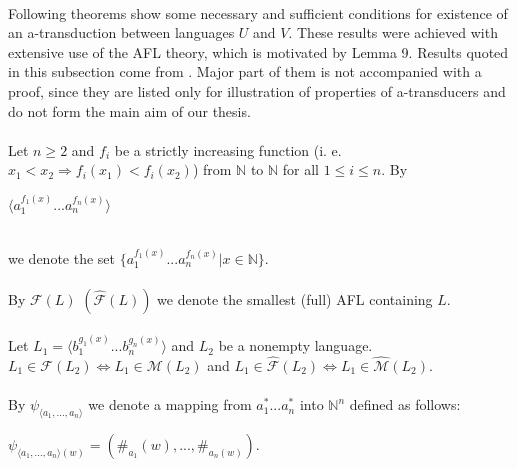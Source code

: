 \paragraph{}
Following theorems show some necessary and sufficient conditions for existence of an a-transduction between languages $U$ and $V$. These results were achieved with extensive use of the AFL theory, which is motivated by Lemma 9. Results quoted in this subsection come from \cite{Rovan:AFL}. Major part of them is not accompanied with a proof, since they are listed only for illustration of properties of a-transducers and do not form the main aim of our thesis.

\paragraph{}
\oznacenie Let $n \geq 2$ and $f_{i}$ be a strictly increasing function (i. e. $x_{1} < x_{2} \Rightarrow f_{i}(x_{1}) < f_{i}(x_{2})$) from $\mathbb{N} $ to $\mathbb{N} $ for all $ 1 \leq i \leq n$. By \\
\centerline{$\langle a_{1}^{f_{1}(x)}...a_{n}^{f_{n}(x)} \rangle $} \\
we denote the set $\{ a_{1}^{f_{1}(x)}...a_{n}^{f_{n}(x)} | x \in \mathbb{N} \} $.

\paragraph{}
\oznacenie By $\mathcal{F}(L) $ $(\hat{\mathcal{F}} (L) )$ we denote the smallest (full) AFL containing $L$.

\paragraph{}
\clema Let $L_{1} = \langle b_{1}^{g_{1}(x)}...b_{n}^{g_{n}(x)} \rangle $ and $L_{2}$ be a nonempty language. $L_{1} \in \mathcal{F}(L_{2}) \Leftrightarrow L_{1} \in \mathcal{M}(L_{2})$ and $L_{1} \in \hat{\mathcal{F}}(L_{2}) \Leftrightarrow L_{1} \in \hat{\mathcal{M}}(L_{2})$.

\paragraph{}
\oznacenie By $\psi_{\langle a_{1},...,a_{n}\rangle }$ we denote a mapping from $a_{1}^{*}...a_{n}^{*}$ into $\mathbb{N}^{n}$ defined as follows: \\
\centerline{$\psi_{\langle a_{1},...,a_{n}\rangle (w) } = (\# _{a_{1}}(w), ..., \# _{a_{n}(w)}) $.}

